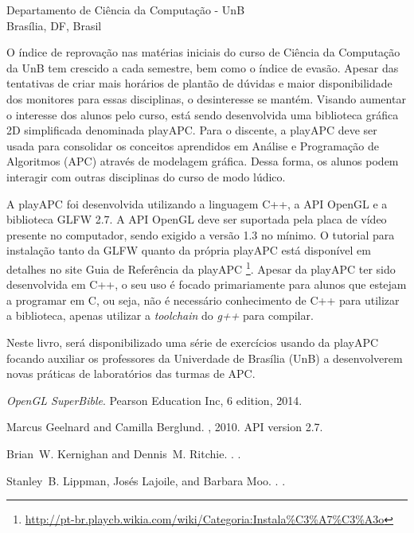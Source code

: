 \documentclass{wileySix}
\begin{document}
\begin{introduction}


{Departamento de Ciência da Computação - UnB\\
Brasília, DF, Brasil}

O índice de reprovação nas matérias iniciais do curso de Ciência da Computação da UnB tem crescido a cada semestre, bem como o índice de evasão. Apesar das tentativas de criar mais horários de plantão de dúvidas e maior disponibilidade dos monitores para essas disciplinas, o desinteresse se mantém. Visando aumentar o interesse dos alunos pelo curso, está sendo desenvolvida uma biblioteca gráfica 2D simplificada denominada playAPC.
Para o discente, a playAPC deve ser usada para consolidar os conceitos aprendidos em Análise e Programação de Algoritmos (APC) através de modelagem gráfica. Dessa forma, os alunos podem interagir com outras disciplinas do curso de modo lúdico. 

A playAPC foi desenvolvida utilizando a linguagem C++, a API OpenGL e a biblioteca GLFW 2.7. A API OpenGL deve ser suportada pela placa de vídeo presente no computador, sendo exigido a versão 1.3 no mínimo. O tutorial para instalação tanto da GLFW quanto da própria playAPC está disponível em detalhes no site Guia de Referência da playAPC \footnote{\url{http://pt-br.playcb.wikia.com/wiki/Categoria:Instala\%C3\%A7\%C3\%A3o}}. Apesar da playAPC ter sido desenvolvida em C++, o seu uso é focado primariamente para alunos que estejam a programar em C, ou seja, não é necessário conhecimento de C++ para utilizar a biblioteca, apenas utilizar a \emph{toolchain} do \emph{g++} para compilar.

Neste livro, será disponibilizado uma série de exercícios usando da playAPC focando auxiliar os professores da Univerdade de Brasília (UnB) a desenvolverem novas práticas de laboratórios das turmas de APC.

\begin{chapreferences}{1}

{\em OpenGL SuperBible}.
\newblock Pearson Education Inc, 6 edition, 2014.

Marcus Geelnard and Camilla Berglund.
, 2010.
\newblock API version 2.7.

Brian~W. Kernighan and Dennis~M. Ritchie.
.
.

Stanley~B. Lippman, Josés Lajoile, and Barbara Moo.
.
.
\end{chapreferences}
\end{introduction}
\end{document}
